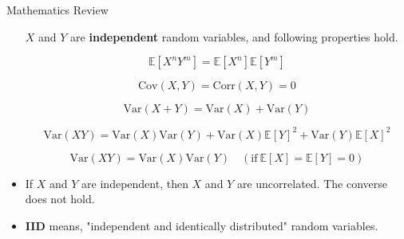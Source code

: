 \begin{frame}[allowframebreaks]
\begin{myconceptblock}{6.31}{Mathematics Review}
\begin{itemize}
        $X$ and $Y$ are \textbf{independent} random variables, and following properties hold.

        $$
        \mathbb{E}[X^n Y^m] = \mathbb{E}[X^n] \mathbb{E}[Y^m]
        $$

        $$
        \text{Cov}(X, Y) = \text{Corr}(X, Y) = 0
        $$

        $$
        \text{Var}(X+Y) = \text{Var}(X) + \text{Var}(Y)
        $$

        $$
        \text{Var}(XY) = \text{Var}(X)\text{Var}(Y) + \text{Var}(X)\mathbb{E}[Y]^2 + \text{Var}(Y)\mathbb{E}[X]^2
        $$

        $$
        \text{Var}(XY) = \text{Var}(X)\text{Var}(Y) \quad (\text{if} \ \mathbb{E}[X]=\mathbb{E}[Y]=0)
        $$
        \item If $X$ and $Y$ are independent, then $X$ and $Y$ are uncorrelated. The converse does not hold.
        \item \textbf{IID} means, "independent and identically distributed" random variables.
    \end{itemize}
\end{myconceptblock}

\end{frame}

